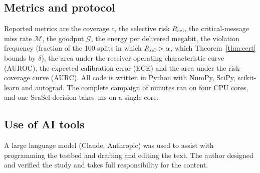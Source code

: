 \subsection{Metrics and protocol}
Reported metrics are the coverage $c$, the selective risk $R_{\rm sel}$, the critical-message miss rate $\mathcal M$, the goodput $\mathcal G$, the energy per delivered megabit, the violation frequency (fraction of the 100 splits in which $R_{\rm sel}>\alpha$, which Theorem~\ref{thm:cert} bounds by $\delta$), the area under the receiver operating characteristic curve (AUROC), the expected calibration error (ECE) and the area under the risk--coverage curve (AURC). All code is written in Python with NumPy, SciPy, scikit-learn and autograd. The complete campaign of \RRuntime{} minutes ran on four CPU cores, and one SeaSel decision takes \RMsDec{}\,ms on a single core.

\subsection{Use of AI tools}
A large language model (Claude, Anthropic) was used to assist with programming the testbed and drafting and editing the text. The author designed and verified the study and takes full responsibility for the content.
